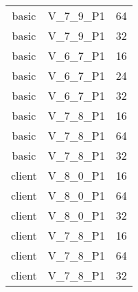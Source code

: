 \begin{longtable}{|c|c|c|}
            basic & V\_7\_9\_P1 & 64 \\
            basic & V\_7\_9\_P1 & 32 \\
            basic & V\_6\_7\_P1 & 16 \\
            basic & V\_6\_7\_P1 & 24 \\
            basic & V\_6\_7\_P1 & 32 \\
            basic & V\_7\_8\_P1 & 16 \\
            basic & V\_7\_8\_P1 & 64 \\
            basic & V\_7\_8\_P1 & 32 \\
            client & V\_8\_0\_P1 & 16 \\
            client & V\_8\_0\_P1 & 64 \\
            client & V\_8\_0\_P1 & 32 \\
            client & V\_7\_8\_P1 & 16 \\
            client & V\_7\_8\_P1 & 64 \\
            client & V\_7\_8\_P1 & 32 \\
        \end{longtable}

